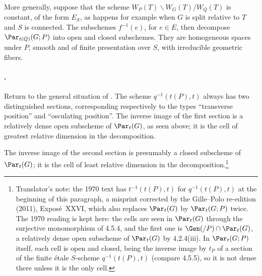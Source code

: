 More generally, suppose that the scheme
\(W_P(T)\backslash W_G(T)/W_Q(T)\) is constant, of the form \(E_S\),
as happens for example when \(G\) is split relative to \(T\) and
\(S\) is connected.  The subschemes \(f^{-1}(e)\), for \(e\in E\),
then decompose \(\Par_{t(Q)}(G;P)\) into open and closed subschemes.
They are homogeneous spaces under \(P\), smooth and of finite
presentation over \(S\), with irreducible geometric fibers.

\paragraph{.}
Return to the general situation of .  The scheme
\(q^{-1}(t(P),t)\) always has two distinguished sections,
corresponding respectively to the types ``transverse position'' and
``osculating position''.  The inverse image of the first section is
a relatively dense open subscheme of \(\Par_t(G)\), as seen above;
it is the cell of greatest relative dimension in the decomposition.

The inverse image of the second section is presumably a closed
subscheme of \(\Par_t(G)\); it is the cell of least relative
dimension in the decomposition.\footnote{Translator's note: the 1970 text has \(t^{-1}(t(P),t)\) for
\(q^{-1}(t(P),t)\) at the beginning of this paragraph, a misprint corrected
by the Gille--Polo re-edition (2011), Exposé~XXVI, which also replaces
\(\Par_t(G)\) by \(\Par_t(G;P)\) twice. The 1970 reading is kept here: the
cells are seen in \(\Par_t(G)\) through the surjective monomorphism of
4.5.4, and the first one is \(\Gen(/P)\cap\Par_t(G)\), a relatively dense
open subscheme of \(\Par_t(G)\) by 4.2.4(iii). In \(\Par_t(G;P)\) itself,
each cell is open and closed, being the inverse image by \(t_P\) of a
section of the finite étale \(S\)-scheme \(q^{-1}(t(P),t)\) (compare
4.5.5), so it is not dense there unless it is the only cell.}
